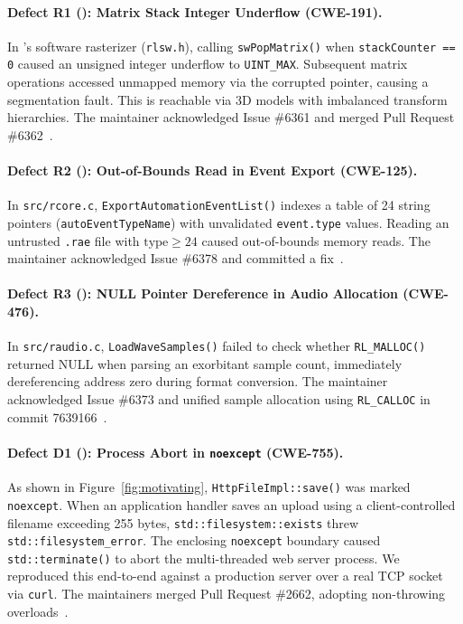\paragraph{Defect R1 (\raylib): Matrix Stack Integer Underflow (CWE-191).}
In \raylib's software rasterizer (\texttt{rlsw.h}), calling \texttt{swPopMatrix()} when \texttt{stackCounter == 0} caused an unsigned integer underflow to \texttt{UINT\_MAX}.
Subsequent matrix operations accessed unmapped memory via the corrupted pointer, causing a segmentation fault.
This is reachable via 3D models with imbalanced transform hierarchies.
The maintainer acknowledged Issue \#6361 and merged Pull Request \#6362~\cite{raylib_issue6361}.

\paragraph{Defect R2 (\raylib): Out-of-Bounds Read in Event Export (CWE-125).}
In \texttt{src/rcore.c}, \texttt{ExportAutomationEventList()} indexes a table of 24 string pointers (\texttt{autoEventTypeName}) with unvalidated \texttt{event.type} values.
Reading an untrusted \texttt{.rae} file with $\text{type} \ge 24$ caused out-of-bounds memory reads.
The maintainer acknowledged Issue \#6378 and committed a fix~\cite{raylib_issue6378}.

\paragraph{Defect R3 (\raylib): NULL Pointer Dereference in Audio Allocation (CWE-476).}
In \texttt{src/raudio.c}, \texttt{LoadWaveSamples()} failed to check whether \texttt{RL\_MALLOC()} returned NULL when parsing an exorbitant sample count, immediately dereferencing address zero during format conversion.
The maintainer acknowledged Issue \#6373 and unified sample allocation using \texttt{RL\_CALLOC} in commit 7639166~\cite{raylib_issue6373}.

\paragraph{Defect D1 (\drogon): Process Abort in \texttt{noexcept} (CWE-755).}
As shown in Figure~\ref{fig:motivating}, \texttt{HttpFileImpl::save()} was marked \texttt{noexcept}.
When an application handler saves an upload using a client-controlled filename exceeding 255 bytes, \texttt{std::}\allowbreak\texttt{filesystem::}\allowbreak\texttt{exists} threw \texttt{std::}\allowbreak\texttt{filesystem\_error}.
The enclosing \texttt{noexcept} boundary caused \texttt{std::}\allowbreak\texttt{terminate()} to abort the multi-threaded web server process.
We reproduced this end-to-end against a production server over a real TCP socket via \texttt{curl}.
The maintainers merged Pull Request \#2662, adopting non-throwing overloads~\cite{drogon_pr2662}.

